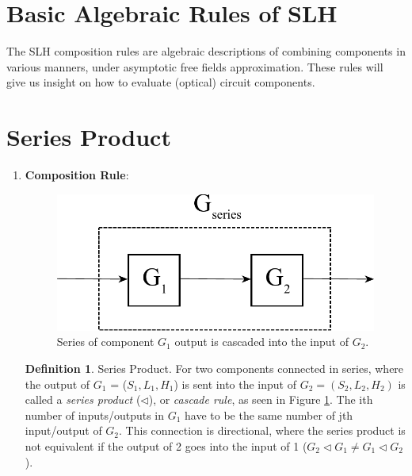 \documentclass[a4paper]{article}
\theoremstyle{definition}
\newtheorem{definition}{Definition}[section]
\begin{document}
\section{Basic Algebraic Rules of SLH}
The SLH composition rules are algebraic descriptions of combining components in various manners, under asymptotic free fields approximation. These rules will give us insight on how to evaluate (optical) circuit components.





\section*{Series Product}
\begin{enumerate}[label=(\roman*)]
\item
\textbf{Composition Rule}: 

\begin{figure}[H]
\centering
\includegraphics[width = 7.5 cm]{Series_Product.pdf}
\caption{Series of component $G_1$ output is cascaded into the input of $G_2$.
}
\label{fig:series}
\end{figure}  


\theoremstyle{definition}
\begin{definition}{Series Product.}
For two components connected in series, where the output of $G_1$ = ($S_1,L_1,H_1$) is sent into the input of $G_2 = (S_2, L_2, H_2)$ is called a \textit{series product} ($\triangleleft$), or \textit{cascade rule}, as seen in Figure \ref{fig:series}. The ith number of inputs/outputs in $G_1$ have to be the same number of jth input/output of $G_2$. This connection is directional, where the series product is not equivalent if the output of 2 goes into the input of 1 ($ G_2 \triangleleft G_1 \ne G_1 \triangleleft G_2$ ).



\end{definition}
\end{enumerate}
\end{document}
